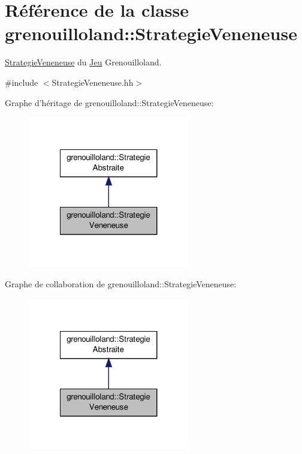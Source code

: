 \hypertarget{classgrenouilloland_1_1StrategieVeneneuse}{\section{Référence de la classe grenouilloland\-:\-:Strategie\-Veneneuse}
\label{classgrenouilloland_1_1StrategieVeneneuse}
}


\hyperlink{classgrenouilloland_1_1StrategieVeneneuse}{Strategie\-Veneneuse} du \hyperlink{classgrenouilloland_1_1Jeu}{Jeu} Grenouilloland.  




{\ttfamily \#include $<$Strategie\-Veneneuse.\-hh$>$}



Graphe d'héritage de grenouilloland\-:\-:Strategie\-Veneneuse\-:
\nopagebreak
\begin{figure}[H]
\begin{center}
\leavevmode
\includegraphics[width=200pt]{classgrenouilloland_1_1StrategieVeneneuse__inherit__graph}
\end{center}
\end{figure}


Graphe de collaboration de grenouilloland\-:\-:Strategie\-Veneneuse\-:
\nopagebreak
\begin{figure}[H]
\begin{center}
\leavevmode
\includegraphics[width=200pt]{classgrenouilloland_1_1StrategieVeneneuse__coll__graph}
\end{center}
\end{figure}
